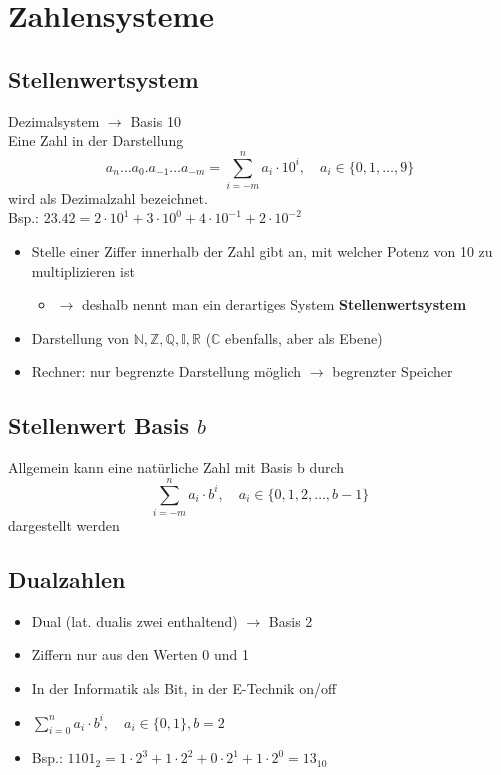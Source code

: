 \documentclass[xcolor=dvipsnames]{beamer}
\begin{document}
\section{Zahlensysteme}
\subsection{Stellenwertsystem}
\begin{frame}
Dezimalsystem $\rightarrow$ Basis 10\\
Eine Zahl in der Darstellung
$$a_n \dots a_0.a_{-1} \dots a_{-m} = \sum_{i=-m}^{n} a_i \cdot 10^i, \quad a_i \in \{0,1, \dots , 9\} $$
wird als Dezimalzahl bezeichnet.\\
Bsp.: $23.42 = 2 \cdot 10^1 + 3 \cdot 10^0 + 4 \cdot 10^{-1} + 2 \cdot 10^{-2}$ 
\end{frame}

\begin{frame}
\begin{itemize}
	\item Stelle einer Ziffer innerhalb der Zahl gibt an, mit welcher Potenz von 10 zu multiplizieren ist
	\begin{itemize}
	\item $\rightarrow$ deshalb nennt man ein derartiges System \textbf{Stellenwertsystem}
	\end{itemize}
	\item Darstellung von $\mathbb{N,Z,Q,I,R}$ ($\mathbb{C}$ ebenfalls, aber als Ebene)
	\item Rechner: nur begrenzte Darstellung möglich $\rightarrow$ begrenzter Speicher
\end{itemize}
\end{frame}

\subsection{Stellenwert Basis $b$}
\begin{frame}
Allgemein kann eine natürliche Zahl mit Basis b durch
$$ \sum_{i=-m}^{n} a_i \cdot b^i, \quad a_i \in \{0,1,2, \dots, b-1 \} $$
dargestellt werden
\end{frame}


\subsection{Dualzahlen}
\begin{frame}
\begin{itemize}
	\item Dual (lat. dualis \glqq zwei enthaltend\grqq) $\rightarrow$ Basis 2
	\item Ziffern nur aus den Werten 0 und 1
	\item In der Informatik als Bit, in der E-Technik \glqq on/off\grqq
	\item $ \sum_{i=0}^{n} a_i \cdot b^i, \quad a_i \in \{0,1\}, b = 2  $
	\item Bsp.: $1101_2 = 1 \cdot 2^3 + 1 \cdot 2^2 + 0 \cdot 2^1 + 1 \cdot 2^0 = 13_{10}$
\end{itemize}
\end{frame}
\end{document}
